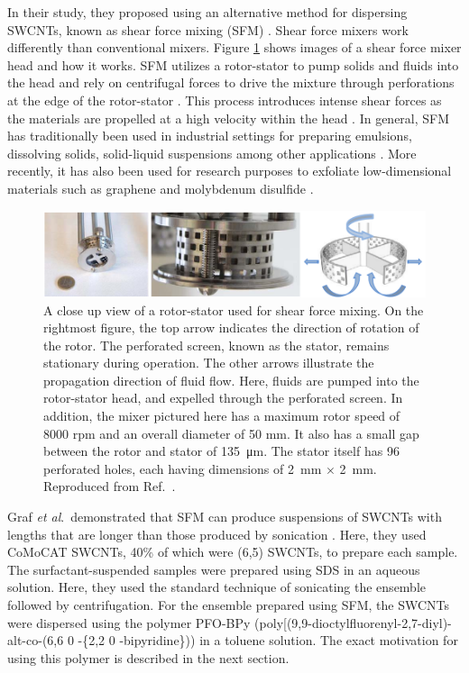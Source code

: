In their study, they proposed using an alternative method for dispersing SWCNTs, known as shear force mixing (SFM) \cite{hall2011scaling, zhang2012high}. Shear force mixers work differently than conventional mixers. Figure \ref{fig:mixing_paton} shows images of a shear force mixer head and how it works. SFM utilizes a rotor-stator to pump solids and fluids into the head and rely on centrifugal forces to drive the mixture through perforations at the edge of the rotor-stator \cite{paton2014scalable}. This process introduces intense shear forces as the materials are propelled at a high velocity within the head \cite{paton2014scalable}. In general, SFM has traditionally been used in industrial settings for preparing emulsions, dissolving solids, solid-liquid suspensions among other applications \cite{hall2011scaling, zhang2012high}. More recently, it has also been used for research purposes to exfoliate low-dimensional materials such as graphene \cite{paton2014scalable} and molybdenum disulfide \cite{varrla2015large}.

\begin{figure}[H]
	\centering
	\includegraphics[scale=0.4]{images/chapter_methods/mixing_paton}
	\caption{A close up view of a rotor-stator used for shear force mixing. On the rightmost figure, the top arrow indicates the direction of rotation of the rotor. The perforated screen, known as the stator, remains stationary during operation. The other arrows illustrate the propagation direction of fluid flow. Here, fluids are pumped into the rotor-stator head, and expelled through the perforated screen. In addition, the mixer pictured here has a maximum rotor speed of 8000 rpm and an overall diameter of 50 mm. It also has a small gap between the rotor and stator of \SI{135}{\micro\meter}. The stator itself has 96 perforated holes, each having dimensions of \SI{2}{\milli\meter} $\times$ \SI{2}{\milli\meter}. Reproduced from Ref.\ \cite{paton2014scalable}. }
	\label{fig:mixing_paton}
\end{figure}

Graf \textit{et al}.\ demonstrated that SFM can produce suspensions of SWCNTs with lengths that are longer than those produced by sonication \cite{graf2016large}. Here, they used CoMoCAT SWCNTs, 40\% of which were (6,5) SWCNTs, to prepare each sample. The surfactant-suspended samples were prepared using SDS in an aqueous solution. Here, they used the standard technique of sonicating the ensemble followed by centrifugation. For the ensemble prepared using SFM, the SWCNTs were dispersed using the polymer PFO-BPy  (poly[(9,9-dioctylfluorenyl-2,7-diyl)-alt-co-(6,6 0 -\{2,2 0 -bipyridine\})) in a toluene solution. The exact motivation for using this polymer is described in the next section.

